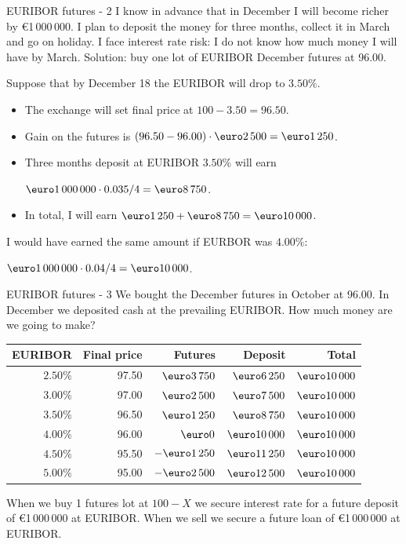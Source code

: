\documentclass{beamer}
\renewcommand{\EUR}[1]{\textup{\euro}#1}
\begin{document}
\begin{frame}{EURIBOR futures - 2}
\justify
I know in advance that in December I will become richer by \EUR{1\,000\,000}. I plan to deposit the money for three months, collect it in March and go on holiday. I face \alert{interest rate risk}: I do not know how  much money I will have by March.
\justify
Solution: buy one lot of EURIBOR December futures at 96.00.

\justify
Suppose that by December 18 the EURIBOR will drop to $3.50\%$.
\begin{itemize}
\justifying
\item The exchange will set final price at $100 - 3.50 = 96.50$.
\item Gain on the futures is $(96.50-96.00)\cdot\EUR{2\,500} = \EUR{1\,250}$.
\item Three months deposit at EURIBOR $3.50\%$ will earn

$\EUR{1\,000\,000} \cdot 0.035 / 4 = \EUR{8\,750}$.
\item In total, I will earn $\EUR{1\,250} + \EUR{8\,750} = \EUR{10\,000}$.
\end{itemize} 

\justify
I would have earned the same amount if EURBOR was $4.00\%$:

$\EUR{1\,000\,000} \cdot 0.04/4 =\EUR{10\,000}$.
\end{frame}



\begin{frame}{EURIBOR futures - 3}
\justify
We bought the December futures in October at 96.00. In December we deposited cash at the prevailing EURIBOR. How much money are we going to make?\
\justify
\centering
\begin{tabular}{r|r|r|r|r}
EURIBOR   & Final price & Futures         & Deposit & Total \\ \hline
$2.50\%$ & 97.50        & $\EUR{3\,750}$      &   $\EUR{6\,250}$  & $\EUR{10\,000}$ \\
$3.00\%$ & 97.00        & $\EUR{2\,500}$      &   $\EUR{7\,500}$  & $\EUR{10\,000}$ \\
$3.50\%$ & 96.50        & $\EUR{1\,250}$      & $\EUR{8\,750}$  & $\EUR{10\,000}$ \\
$4.00\%$ & 96.00        & $\EUR{0}$                & $\EUR{10\,000}$  & $\EUR{10\,000}$ \\
$4.50\%$ & 95.50        & $-\EUR{1\,250}$    & $\EUR{11\,250}$ & $\EUR{10\,000}$ \\
$5.00\%$ & 95.00        & $-\EUR{2\,500}$    & $\EUR{12\,500}$ & $\EUR{10\,000}$
\end{tabular}

\justify
When we buy 1 futures lot at $100-X$ we secure interest rate for a future deposit of \EUR{1\,000\,000} at EURIBOR. When we sell we secure a future loan of \EUR{1\,000\,000} at EURIBOR.
\end{frame}
\end{document}

